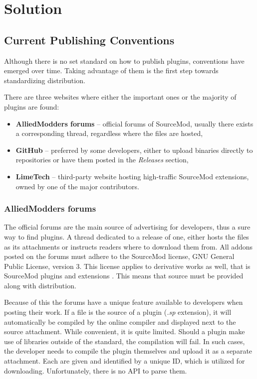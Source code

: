 \chapter{Solution}

\section{Current Publishing Conventions}

Although there is no set standard on how to publish plugins, conventions have emerged over time.
Taking advantage of them is the first step towards standardizing distribution.

There are three websites where either the important ones or the majority of plugins are found:
\begin{itemize}
    \item \textbf{AlliedModders forums} -- official forums of SourceMod, usually there exists a corresponding thread, regardless where the files are hosted,
    \item \textbf{GitHub} -- preferred by some developers, either to upload binaries directly to repositories or have them posted in the \textit{Releases} section,
    \item \textbf{LimeTech} -- third-party website hosting high-traffic SourceMod extensions, owned by one of the major contributors.
\end{itemize}

\subsection{AlliedModders forums}

The official forums are the main source of advertising for developers, thus a sure way to find plugins.
A thread dedicated to a release of one, either hosts the files as its attachments or instructs readers where to download them from.
All addons posted on the forums must adhere to the SourceMod license, GNU General Public License, version 3.
This license applies to derivative works as well, that is SourceMod plugins and extensions \cite{sourcemod-license}.
This means that source must be provided along with distribution.

Because of this the forums have a unique feature available to developers when posting their work.
If a file is the source of a plugin (\textit{.sp} extension), it will automatically be compiled by the online compiler and displayed next to the source attachment.
While convenient, it is quite limited.
Should a plugin make use of libraries outside of the standard, the compilation will fail.
In such cases, the developer needs to compile the plugin themselves and upload it as a separate attachment.
Each are given and identified by a unique ID, which is utilized for downloading.
Unfortunately, there is no API to parse them.

